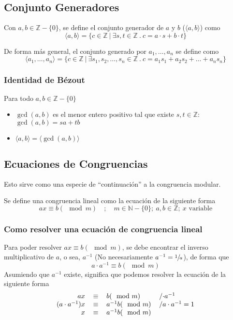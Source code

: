 \documentclass[../main.tex]{subfiles}
\begin{document}
\subsection{Conjunto Generadores}
Con $a,b \in \mathds{Z} - \{0\}$, se define el conjunto generador de $a$ y $b$ ($\langle a,b \rangle$) como
\[ \langle a,b \rangle = \{ c \in \mathds{Z}\ |\ \exists s,t \in \mathds{Z}\ .\ c = a \cdot s + b \cdot t \} \]

De forma más general, el conjunto generado por $a_1, \ldots, a_n$ se define como
\[ \langle a_1, \ldots, a_n \rangle = \{ c \in \mathds{Z}\ |\ \exists s_1,s_2,\ldots,s_n \in \mathds{Z}\ .\ c = a_1 s_1 + a_2 s_2 + \ldots + a_n s_n \} \]

\subsubsection{Identidad de Bézout}
Para todo $a,b \in \mathds{Z} - \{0\}$
\begin{itemize}
    \item $\gcd(a,b)$ es el menor entero positivo tal que existe $s,t \in \mathds{Z}$: $\gcd(a,b) = sa + tb$
    \item $\langle a,b \rangle = \langle \gcd(a,b) \rangle$
\end{itemize}

\subsection{Ecuaciones de Congruencias}
Esto sirve como una especie de ``continuación'' a la congruencia modular.

Se define una congruencia lineal como la ecuación de la siguiente forma
\[ a x \equiv b (\mod m) \quad ; \quad m \in \mathds{N}-\{0\};\ a,b \in \mathds{Z};\ x \text{ variable} \]

\subsubsection{Como resolver una ecuación de congruencia lineal}
Para poder resolver $a x \equiv b (\mod m)$, se debe encontrar el inverso multiplicativo de $a$, o sea, $a^{-1}$ (No necesariamente $a^{-1} = \sfrac{1}{a}$), de forma que
\[ a \cdot a^{-1} \equiv b (\mod m) \]
Asumiendo que $a^{-1}$ existe, significa que podemos resolver la ecuación de la siguiente forma
\[
    \begin{tabular}{rcll}
        $a x$ & $\equiv$ & $b (\mod m)$ & /$\cdot a^{-1}$\\
        $(a \cdot a^{-1}) x$ & $\equiv$ & $a^{-1} b (\mod m)$ & /$a \cdot a^{-1} = 1$\\
        $x$ & $\equiv$ & $a^{-1} b (\mod m)$\\
    \end{tabular}
\]
\end{document}

